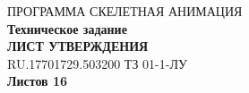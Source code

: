 \newpage
\vspace*{3cm}
\begin{center}
{ПРОГРАММА СКЕЛЕТНАЯ АНИМАЦИЯ} \\
\medskip
{\small\textbf{Техническое задание}} \\
\medskip
{\textbf{ЛИСТ УТВЕРЖДЕНИЯ} \\
\medskip
RU.17701729.503200 ТЗ 01-1-ЛУ} \\
\bigskip
\bigskip
\textbf{Листов 16}
\end{center}
